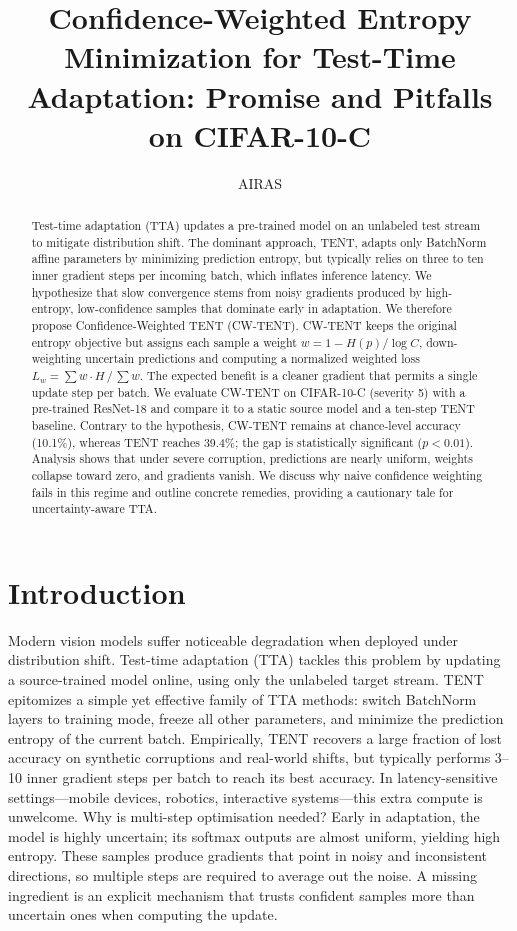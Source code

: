 \documentclass{article} %
\title{Confidence-Weighted Entropy Minimization for Test-Time Adaptation: Promise and Pitfalls on CIFAR-10-C}
\author{AIRAS}
\begin{document}
\maketitle

\begin{abstract}
Test-time adaptation (TTA) updates a pre-trained model on an unlabeled test stream to mitigate distribution shift. The dominant approach, TENT, adapts only BatchNorm affine parameters by minimizing prediction entropy, but typically relies on three to ten inner gradient steps per incoming batch, which inflates inference latency. We hypothesize that slow convergence stems from noisy gradients produced by high-entropy, low-confidence samples that dominate early in adaptation. We therefore propose Confidence-Weighted TENT (CW-TENT)\@. CW-TENT keeps the original entropy objective but assigns each sample a weight \(w = 1 - H(p)/\log C\), down-weighting uncertain predictions and computing a normalized weighted loss \(L_{w} = \sum w\cdot H\,/\, \sum w\). The expected benefit is a cleaner gradient that permits a single update step per batch. We evaluate CW-TENT on CIFAR-10-C (severity 5) with a pre-trained ResNet-18 and compare it to a static source model and a ten-step TENT baseline. Contrary to the hypothesis, CW-TENT remains at chance-level accuracy (10.1\%), whereas TENT reaches 39.4\%; the gap is statistically significant (\(p < 0.01\)). Analysis shows that under severe corruption, predictions are nearly uniform, weights collapse toward zero, and gradients vanish. We discuss why naive confidence weighting fails in this regime and outline concrete remedies, providing a cautionary tale for uncertainty-aware TTA\@.
\end{abstract}

\section{Introduction}%
\label{sec:intro}%
Modern vision models suffer noticeable degradation when deployed under distribution shift. Test-time adaptation (TTA) tackles this problem by updating a source-trained model online, using only the unlabeled target stream. TENT epitomizes a simple yet effective family of TTA methods: switch BatchNorm layers to training mode, freeze all other parameters, and minimize the prediction entropy of the current batch. Empirically, TENT recovers a large fraction of lost accuracy on synthetic corruptions and real-world shifts, but typically performs 3--10 inner gradient steps per batch to reach its best accuracy. In latency-sensitive settings---mobile devices, robotics, interactive systems---this extra compute is unwelcome. Why is multi-step optimisation needed? Early in adaptation, the model is highly uncertain; its softmax outputs are almost uniform, yielding high entropy. These samples produce gradients that point in noisy and inconsistent directions, so multiple steps are required to average out the noise. A missing ingredient is an explicit mechanism that trusts confident samples more than uncertain ones when computing the update.
\end{document}
